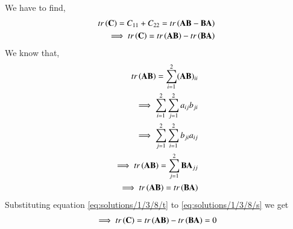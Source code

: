 We have to find,
\begin{align}
 tr\left(\mathbf{C}\right) = C_{11}+C_{22} = tr\left(\mathbf{AB}-\mathbf{BA}\right)\\
 \implies  tr\left(\mathbf{C}\right) = tr\left(\mathbf{AB}\right)-tr\left(\mathbf{BA}\right)\label{eq:solutions/1/3/8/s}
\end{align}
We know that,
\begin{align}
tr\left(\mathbf{AB}\right) = \sum_{i=1}^2(\mathbf{AB})_{ii}\\
\implies \sum_{i=1}^2\sum_{j=1}^2a_{ij}b_{ji}\\
\implies \sum_{j=1}^2\sum_{i=1}^2b_{ji}a_{ij}\\
\implies tr\left(\mathbf{AB}\right) = \sum_{j=1}^2\mathbf{BA}_{jj}\\
\implies tr\left(\mathbf{AB}\right) = tr\left(\mathbf{BA}\right)
\label{eq:solutions/1/3/8/t}
\end{align}
Substituting equation \eqref{eq:solutions/1/3/8/t} to \eqref{eq:solutions/1/3/8/s} we get
\begin{align}
\implies  tr\left(\mathbf{C}\right) = tr\left(\mathbf{AB}\right)-tr\left(\mathbf{BA}\right) = 0
\end{align}


